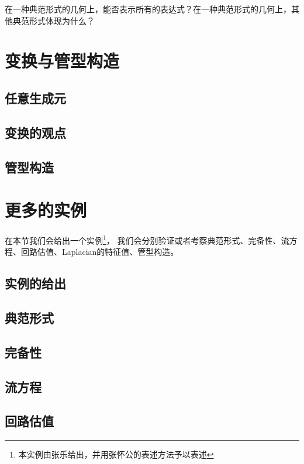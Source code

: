 \documentclass[a4paper,12pt]{article}
\numberwithin{definition}{section}
\numberwithin{lemma}{section}
\numberwithin{proposition}{section}
\numberwithin{theorem}{section}
\numberwithin{grammar}{section}
\numberwithin{program}{section}
\numberwithin{convention}{section}
\numberwithin{corollary}{section}
\begin{document}
在一种典范形式的几何上，能否表示所有的表达式？在一种典范形式的几何上，其他典范形式体现为什么？

\newpage

\section{变换与管型构造}

\subsection{任意生成元}

\subsection{变换的观点}

\subsection{管型构造}

\newpage

\section{更多的实例}

在本节我们会给出一个实例\footnote[1]{本实例由张乐给出，并用张怀公的表述方法予以表述}，
我们会分别验证或者考察典范形式、完备性、流方程、回路估值、Laplacian的特征值、管型构造。

\subsection{实例的给出}

\subsection{典范形式}

\subsection{完备性}

\subsection{流方程}

\subsection{回路估值}
\end{document}
